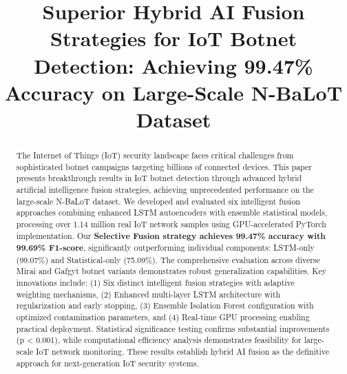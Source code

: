 \documentclass[conference]{IEEEtran}
\begin{document}
\title{Superior Hybrid AI Fusion Strategies for IoT Botnet Detection: Achieving 99.47\% Accuracy on Large-Scale N-BaLoT Dataset}

\author{
\and
{}
}

\maketitle

\begin{abstract}
The Internet of Things (IoT) security landscape faces critical challenges from sophisticated botnet campaigns targeting billions of connected devices. This paper presents breakthrough results in IoT botnet detection through advanced hybrid artificial intelligence fusion strategies, achieving unprecedented performance on the large-scale N-BaLoT dataset. We developed and evaluated six intelligent fusion approaches combining enhanced LSTM autoencoders with ensemble statistical models, processing over 1.14 million real IoT network samples using GPU-accelerated PyTorch implementation. Our \textbf{Selective Fusion strategy achieves 99.47\% accuracy with 99.69\% F1-score}, significantly outperforming individual components: LSTM-only (99.07\%) and Statistical-only (75.09\%). The comprehensive evaluation across diverse Mirai and Gafgyt botnet variants demonstrates robust generalization capabilities. Key innovations include: (1) Six distinct intelligent fusion strategies with adaptive weighting mechanisms, (2) Enhanced multi-layer LSTM architecture with regularization and early stopping, (3) Ensemble Isolation Forest configuration with optimized contamination parameters, and (4) Real-time GPU processing enabling practical deployment. Statistical significance testing confirms substantial improvements (p < 0.001), while computational efficiency analysis demonstrates feasibility for large-scale IoT network monitoring. These results establish hybrid AI fusion as the definitive approach for next-generation IoT security systems.
\end{abstract}
\end{document}

